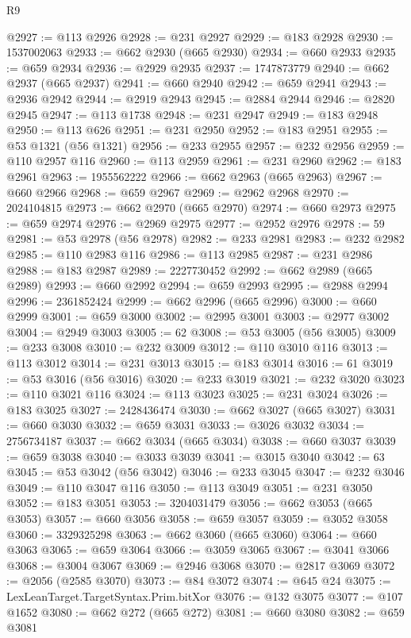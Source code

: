 \begin{lexlean}{R9}
\begin{coremodule}
@2927 := @113 @2926
@2928 := @231 @2927
@2929 := @183 @2928
@2930 := 1537002063
@2933 := @662 @2930 (@665 @2930)
@2934 := @660 @2933
@2935 := @659 @2934
@2936 := @2929 @2935
@2937 := 1747873779
@2940 := @662 @2937 (@665 @2937)
@2941 := @660 @2940
@2942 := @659 @2941
@2943 := @2936 @2942
@2944 := @2919 @2943
@2945 := @2884 @2944
@2946 := @2820 @2945
@2947 := @113 @1738
@2948 := @231 @2947
@2949 := @183 @2948
@2950 := @113 @626
@2951 := @231 @2950
@2952 := @183 @2951
@2955 := @53 @1321 (@56 @1321)
@2956 := @233 @2955
@2957 := @232 @2956
@2959 := @110 @2957 @116
@2960 := @113 @2959
@2961 := @231 @2960
@2962 := @183 @2961
@2963 := 1955562222
@2966 := @662 @2963 (@665 @2963)
@2967 := @660 @2966
@2968 := @659 @2967
@2969 := @2962 @2968
@2970 := 2024104815
@2973 := @662 @2970 (@665 @2970)
@2974 := @660 @2973
@2975 := @659 @2974
@2976 := @2969 @2975
@2977 := @2952 @2976
@2978 := 59
@2981 := @53 @2978 (@56 @2978)
@2982 := @233 @2981
@2983 := @232 @2982
@2985 := @110 @2983 @116
@2986 := @113 @2985
@2987 := @231 @2986
@2988 := @183 @2987
@2989 := 2227730452
@2992 := @662 @2989 (@665 @2989)
@2993 := @660 @2992
@2994 := @659 @2993
@2995 := @2988 @2994
@2996 := 2361852424
@2999 := @662 @2996 (@665 @2996)
@3000 := @660 @2999
@3001 := @659 @3000
@3002 := @2995 @3001
@3003 := @2977 @3002
@3004 := @2949 @3003
@3005 := 62
@3008 := @53 @3005 (@56 @3005)
@3009 := @233 @3008
@3010 := @232 @3009
@3012 := @110 @3010 @116
@3013 := @113 @3012
@3014 := @231 @3013
@3015 := @183 @3014
@3016 := 61
@3019 := @53 @3016 (@56 @3016)
@3020 := @233 @3019
@3021 := @232 @3020
@3023 := @110 @3021 @116
@3024 := @113 @3023
@3025 := @231 @3024
@3026 := @183 @3025
@3027 := 2428436474
@3030 := @662 @3027 (@665 @3027)
@3031 := @660 @3030
@3032 := @659 @3031
@3033 := @3026 @3032
@3034 := 2756734187
@3037 := @662 @3034 (@665 @3034)
@3038 := @660 @3037
@3039 := @659 @3038
@3040 := @3033 @3039
@3041 := @3015 @3040
@3042 := 63
@3045 := @53 @3042 (@56 @3042)
@3046 := @233 @3045
@3047 := @232 @3046
@3049 := @110 @3047 @116
@3050 := @113 @3049
@3051 := @231 @3050
@3052 := @183 @3051
@3053 := 3204031479
@3056 := @662 @3053 (@665 @3053)
@3057 := @660 @3056
@3058 := @659 @3057
@3059 := @3052 @3058
@3060 := 3329325298
@3063 := @662 @3060 (@665 @3060)
@3064 := @660 @3063
@3065 := @659 @3064
@3066 := @3059 @3065
@3067 := @3041 @3066
@3068 := @3004 @3067
@3069 := @2946 @3068
@3070 := @2817 @3069
@3072 := @2056 (@2585 @3070)
@3073 := @84 @3072
@3074 := @645 @24
@3075 := LexLeanTarget.TargetSyntax.Prim.bitXor
@3076 := @132 @3075
@3077 := @107 @1652
@3080 := @662 @272 (@665 @272)
@3081 := @660 @3080
@3082 := @659 @3081

\end{coremodule}
\end{lexlean}
